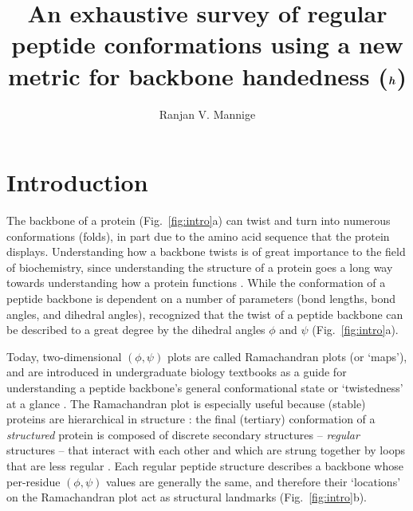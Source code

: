 \documentclass[fleqn,10pt,lineno]{wlpeerj} %
\title{An exhaustive survey of regular peptide conformations using a new metric for backbone handedness ($\bm{h}$)}
\author[1,2,*]{Ranjan V. Mannige}
\affil[1]{~Molecular Foundry, Lawrence Berkeley National Laboratory, Berkeley, CA, U.S.A.}
\affil[2]{~Present address: Multiscale Institute, Redwood City, CA, U.S.A.}
\affil[*]{~ranjanmannige@gmail.com}
\newcommand{\n}[1]{{\color{black}#1}} %
\newcommand{\Fig}[1]{Fig.~\ref{#1}}
\begin{document}
\flushbottom
\maketitle
\thispagestyle{empty}

\section*{Introduction}

The backbone of a protein (\Fig{fig:intro}a) can twist and turn into numerous conformations (folds), in part due to the amino acid sequence that the protein displays. %
Understanding how a backbone twists is of great importance to the field of biochemistry, since understanding the structure of a protein goes a long way towards understanding how a protein functions \citep{Alberts2002,Berg2006}. While the conformation of a peptide backbone is dependent on a number of parameters (bond lengths, bond angles, and dihedral angles), \cite{Ramachandran1963} recognized that the twist of a peptide backbone can be described to a great degree by the dihedral angles $\phi$ and $\psi$ (\Fig{fig:intro}a).

Today, two-dimensional $(\phi,\psi)$ plots are called Ramachandran plots (or `maps'), and are introduced in undergraduate biology textbooks as a guide for understanding a peptide backbone's general conformational state or `twistedness' at a glance 
\citep{Bragg1950, Pauling1951a, Pauling1951, Linderstrom-Lang1952, Laskowski1993, Chothia1997, Hooft1997, Cooper2000, Alberts2002, Laskowski2003, Ho2003, Eisenberg2003, Berg2006, Mannige2016}. 
The Ramachandran plot is especially useful because (stable) proteins are hierarchical in structure \citep{Linderstrom-Lang1952}: the final (tertiary) conformation of a {\em structured} protein is composed of discrete secondary structures -- {\em regular} structures -- that interact with each other and \n{which} are strung together by loops that are less regular \citep{Alberts2002,Berg2006}. Each regular \n{peptide} structure describes a backbone whose per-residue $(\phi,\psi)$ values are generally the same, and therefore their `locations' on the Ramachandran plot act as structural landmarks (\Fig{fig:intro}b).
\end{document}

